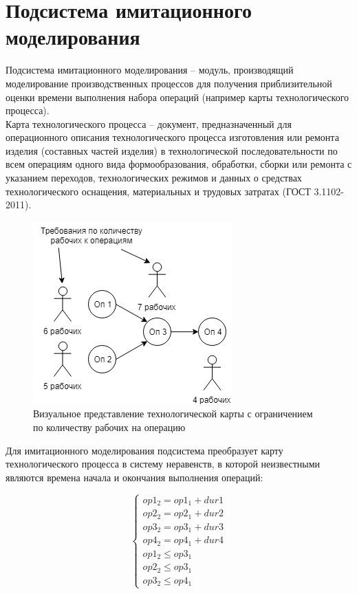 \section{Подсистема имитационного моделирования}
\indent Подсистема имитационного моделирования -- модуль, производящий моделирование производственных процессов для получения приблизительной оценки времени выполнения набора операций (например карты технологического процесса).\\
\indent Карта технологического процесса -- документ, предназначенный для операционного описания технологического процесса изготовления или ремонта изделия (составных частей изделия) в технологической последовательности по всем операциям одного вида формообразования, обработки, сборки или ремонта с указанием переходов, технологических режимов и данных о средствах технологического оснащения, материальных и трудовых затратах (ГОСТ 3.1102-2011).

\begin{figure}[ht]
	\centering
	\includegraphics[width=0.5\linewidth]{pics/techMapViz.png}
	\caption{Визуальное представление технологической карты с ограничением по количеству рабочих на операцию}
	\label{fig:map}
\end{figure}

\indent Для имитационного моделирования подсистема преобразует карту технологического процесса в систему неравенств, в которой неизвестными являются времена начала и окончания выполнения операций:

\begin{equation}
	\label{eq:system}
	\begin{cases}
		op1_2 = op1_1 + dur1\\
		op2_2 = op2_1 + dur2\\
		op3_2 = op3_1 + dur3\\
		op4_2 = op4_1 + dur4\\
		op1_2 \leq op3_1\\
		op2_2 \leq op3_1\\
		op3_2 \leq op4_1
	\end{cases}
\end{equation}

